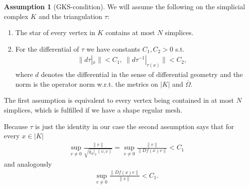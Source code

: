 \documentclass[12pt,a4paper]{article}
\theoremstyle{definition}
\newtheorem{assumption}{Assumption}
\newcommand{\omegabar}{\overline{\Omega}}
\newcommand{\real}{\mathbb{R}}
\begin{document}
\begin{assumption}[GKS-condition]
    We will assume the following on the simplicial complex $K$ 
    and the triangulation $\tau$:
    \begin{enumerate}
    \item The star of every vertex in $K$ contains at most $N$ simplices.
    \item For the differential of $\tau$ we have constants 
        $C_1, C_2 > 0$ s.t.
        \begin{align*}
        \lVert d\tau|_x \rVert < C_1, \; 
        \lVert d\tau^{-1}|_{\tau(x)} \rVert < C_2,
        \end{align*}
        where $d$ denotes the differential in the sense of differential 
        geometry and the norm is the operator norm w.r.t. the metrics on $|K|$ 
        and $\omegabar$.
    \end{enumerate}
\end{assumption}
The first assumption is equivalent to every vertex being contained in
at most $N$ simplices, which is fulfilled if we have a shape regular mesh.\par

Because $\tau$ is just the identity in our case 
the second assumption says that for every 
$x \in |K|$
\begin{align*}
\sup\limits_{v \neq 0} \frac{\lVert v \rVert}{\sqrt{g_S|_x(v,v)}} =
\sup\limits_{v \neq 0} \frac{\lVert v \rVert}{\lVert Df(x)v\rVert} < C_1
\end{align*}
and analogously
\begin{align*}
    \sup\limits_{v \neq 0} \frac{\lVert Df(x)v\rVert}{\lVert v \rVert} < C_1.
\end{align*}

\end{document}
